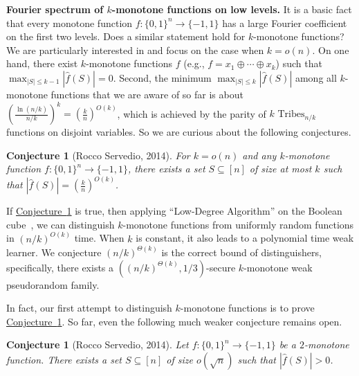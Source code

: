 \documentclass[11pt]{article}
\numberwithin{equation}{section}
\newtheorem{conjecture}[theorem]{Conjecture}
\theoremstyle{definition}
\theoremstyle{plain}
\newcommand{\expref}[2]{\hyperref[#2]{#1~\ref{#2}}}
\begin{document}
\vspace{2ex}
\noindent\textbf{Fourier spectrum of $k$-monotone functions on low levels.} It is a basic fact \cite{book} that every monotone function $f:\{0,1\}^n\rightarrow\{-1,1\}$ has a large Fourier coefficient on the first two levels. Does a similar statement hold for $k$-monotone functions? We are particularly interested in and focus on the case when $k=o(n)$. 
On one hand, there exist $k$-monotone functions $f$ (e.g., $f=x_1\oplus\cdots\oplus x_k$) such that $\max_{|S|\leq k-1}|\hat{f}(S)|=0$. Second, the minimum $\max_{|S|\leq k}|\hat{f}(S)|$ among all $k$-monotone functions that we are aware of so far is about $\left(\frac{\ln (n/k)}{n/k}\right)^k=\left(\frac{k}{n}\right)^{O(k)}$, which is achieved by the parity of $k$ $\text{Tribes}_{n/k}$ functions on disjoint variables. So we %
are curious about the following conjectures. %

%
%
%
%
%
\begin{conjecture}[Rocco Servedio, 2014]  %
\label{conj:fourier_spectrum} 
For $k=o(n)$ and any $k$-monotone function $f:\{0,1\}^n\rightarrow \{-1,1\}$, there exists a set $S\subseteq[n]$ of size at most $k$ such that $|\hat{f}(S)|=\left(\frac{k}{n}\right)^{O(k)}$.
\end{conjecture}

If \expref{Conjecture}{conj:fourier_spectrum} is true, then applying ``Low-Degree Algorithm'' on the Boolean cube~\cite{LMN93}, we can distinguish $k$-monotone functions from uniformly random functions in $(n/k)^{O(k)}$ time. When $k$ is constant, it also leads to a polynomial time weak learner. We conjecture $(n/k)^{\Theta(k)}$ is the correct bound of distinguishers, specifically, there exists a $\left((n/k)^{\Theta(k)},1/3\right)$-secure $k$-monotone weak pseudorandom family.
%

In fact, our first attempt to distinguish $k$-monotone functions is to prove \expref{Conjecture}{conj:fourier_spectrum}. So far, even the following much weaker conjecture remains open.
%
%
%
%
\begin{conjecture}[Rocco Servedio, 2014]  %
\label{conj:fourier_spectrum2} 
	Let $f:\{0,1\}^n\rightarrow \{-1,1\}$ be a $2$-monotone function. There exists a set $S\subseteq[n]$ of size $o(\sqrt{n})$ such that $|\hat{f}(S)|>0$.
\end{conjecture}
\end{document}
